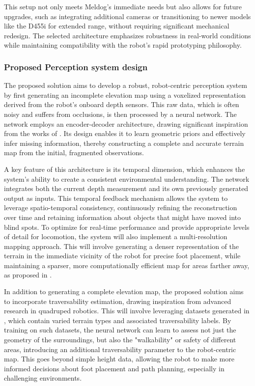 This setup not only meets Meldog’s immediate needs but also allows for future upgrades, such as integrating additional cameras or transitioning to newer models like the D455i for extended range, without requiring significant mechanical redesign. The selected architecture emphasizes robustness in real-world conditions while maintaining compatibility with the robot’s rapid prototyping philosophy.

\subsubsection{Proposed Perception system design}

The proposed solution aims to develop a robust, robot-centric perception system by first generating an incomplete elevation map using a voxelized representation derived from the robot's onboard depth sensors. This raw data, which is often noisy and suffers from occlusions, is then processed by a neural network. The network employs an encoder-decoder architecture, drawing significant inspiration from the works of \cite{Neural_Scene_Representation_for_Locomotion_on_Structured_Terrain}. Its design enables it to learn geometric priors and effectively infer missing information, thereby constructing a complete and accurate terrain map from the initial, fragmented observations.

A key feature of this architecture is its temporal dimension, which enhances the system's ability to create a consistent environmental understanding. The network integrates both the current depth measurement and its own previously generated output as inputs. This temporal feedback mechanism allows the system to leverage spatio-temporal consistency, continuously refining the reconstruction over time and retaining information about objects that might have moved into blind spots. To optimize for real-time performance and provide appropriate levels of detail for locomotion, the system will also implement a multi-resolution mapping approach. This will involve generating a denser representation of the terrain in the immediate vicinity of the robot for precise foot placement, while maintaining a sparser, more computationally efficient map for areas farther away, as proposed in \cite{ANYmal_parkour:_Learning_agile_navigation_for_quadrupedal_robots}.

In addition to generating a complete elevation map, the proposed solution aims to incorporate traversability estimation, drawing inspiration from advanced research in quadruped robotics. This will involve leveraging datasets generated in \cite{Locomotion_Policy_Guided_Traversability_Learning_using_Volumetric_Representations_of_Complex_Environments}, which contain varied terrain types and associated traversability labels. By training on such datasets, the neural network can learn to assess not just the geometry of the surroundings, but also the "walkability" or safety of different areas, introducing an additional traversability parameter to the robot-centric map. This goes beyond simple height data, allowing the robot to make more informed decisions about foot placement and path planning, especially in challenging environments.

